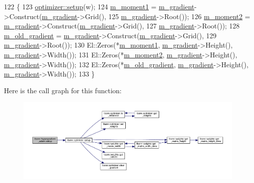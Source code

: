 \begin{DoxyCode}
122                                          \{
123   \hyperlink{classlbann_1_1optimizer_a7641a88b3c166df2d974a298622b992b}{optimizer::setup}(w);
124   \hyperlink{classlbann_1_1hypergradient__adam_a529f3b53732247ebfb649f55f1fae4d6}{m\_moment1} = \hyperlink{classlbann_1_1optimizer_a3df20cb0ae2b60430ad4fd235d66c12e}{m\_gradient}->Construct(\hyperlink{classlbann_1_1optimizer_a3df20cb0ae2b60430ad4fd235d66c12e}{m\_gradient}->Grid(),
125                                     \hyperlink{classlbann_1_1optimizer_a3df20cb0ae2b60430ad4fd235d66c12e}{m\_gradient}->Root());
126   \hyperlink{classlbann_1_1hypergradient__adam_a73b77fb79bd8e9bbfc8f360197899d18}{m\_moment2} = \hyperlink{classlbann_1_1optimizer_a3df20cb0ae2b60430ad4fd235d66c12e}{m\_gradient}->Construct(\hyperlink{classlbann_1_1optimizer_a3df20cb0ae2b60430ad4fd235d66c12e}{m\_gradient}->Grid(),
127                                     \hyperlink{classlbann_1_1optimizer_a3df20cb0ae2b60430ad4fd235d66c12e}{m\_gradient}->Root());
128   \hyperlink{classlbann_1_1hypergradient__adam_a2e52355f77edf55bdac8a3eed79f44c4}{m\_old\_gradient} = \hyperlink{classlbann_1_1optimizer_a3df20cb0ae2b60430ad4fd235d66c12e}{m\_gradient}->Construct(\hyperlink{classlbann_1_1optimizer_a3df20cb0ae2b60430ad4fd235d66c12e}{m\_gradient}->Grid(),
129                                     \hyperlink{classlbann_1_1optimizer_a3df20cb0ae2b60430ad4fd235d66c12e}{m\_gradient}->Root());
130   El::Zeros(*\hyperlink{classlbann_1_1hypergradient__adam_a529f3b53732247ebfb649f55f1fae4d6}{m\_moment1}, \hyperlink{classlbann_1_1optimizer_a3df20cb0ae2b60430ad4fd235d66c12e}{m\_gradient}->Height(), \hyperlink{classlbann_1_1optimizer_a3df20cb0ae2b60430ad4fd235d66c12e}{m\_gradient}->Width());
131   El::Zeros(*\hyperlink{classlbann_1_1hypergradient__adam_a73b77fb79bd8e9bbfc8f360197899d18}{m\_moment2}, \hyperlink{classlbann_1_1optimizer_a3df20cb0ae2b60430ad4fd235d66c12e}{m\_gradient}->Height(), \hyperlink{classlbann_1_1optimizer_a3df20cb0ae2b60430ad4fd235d66c12e}{m\_gradient}->Width());
132   El::Zeros(*\hyperlink{classlbann_1_1hypergradient__adam_a2e52355f77edf55bdac8a3eed79f44c4}{m\_old\_gradient}, \hyperlink{classlbann_1_1optimizer_a3df20cb0ae2b60430ad4fd235d66c12e}{m\_gradient}->Height(), 
      \hyperlink{classlbann_1_1optimizer_a3df20cb0ae2b60430ad4fd235d66c12e}{m\_gradient}->Width());
133 \}
\end{DoxyCode}
Here is the call graph for this function\+:\nopagebreak
\begin{figure}[H]
\begin{center}
\leavevmode
\includegraphics[width=350pt]{classlbann_1_1hypergradient__adam_acbc4aa4410eb2e7cb2fd9f423c4909dc_cgraph}
\end{center}
\end{figure}

